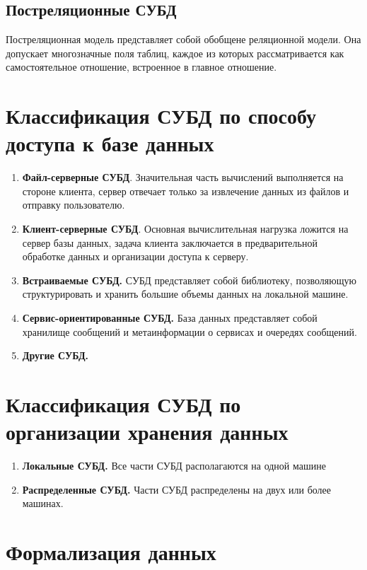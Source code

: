\subsection*{Постреляционные СУБД}

Постреляционная модель представляет собой обобщене реляционной модели. Она допускает многозначные поля таблиц, каждое из которых рассматривается как самостоятельное отношение, встроенное в главное отношение. 

\section{Классификация СУБД по способу доступа к базе данных}

\begin{enumerate}
	\item \textbf{Файл-серверные СУБД}.
	Значительная часть вычислений выполняется на стороне клиента, сервер отвечает только за извлечение данных из файлов и отправку пользователю.
	\item \textbf{Клиент-серверные СУБД}.
	 Основная вычислительная нагрузка ложится на сервер базы данных, задача клиента заключается в предварительной обработке данных и организации доступа к серверу.
	\item \textbf{Встраиваемые СУБД.} 
	СУБД представляет собой библиотеку, позволяющую структурировать и хранить большие объемы данных на локальной машине. 
	\item \textbf{Сервис-ориентированные СУБД.} 
	База данных представляет собой хранилище сообщений и метаинформации о сервисах и очередях сообщений.
	
	\item \textbf{Другие СУБД.}

\end{enumerate}	
\section{Классификация СУБД по организации хранения данных}
\begin{enumerate}
	\item \textbf{Локальные СУБД.} 
	Все части СУБД располагаются на одной машине
	
	\item \textbf{Распределенные СУБД.}
	Части СУБД распределены на двух или более машинах.
\end{enumerate}

\section{Формализация данных}

